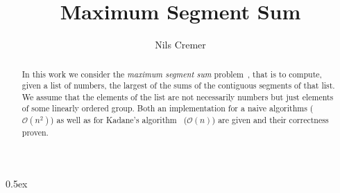\documentclass[11pt,a4paper]{article}
\begin{document}
\title{Maximum Segment Sum}
\author{Nils Cremer}
\maketitle

\begin{abstract}
  In this work we consider the \emph{maximum segment sum} problem~\cite{wiki}, that is to compute, given a list of numbers,
the largest of the sums of the contiguous segments of that list.
We assume that the elements of the list are not necessarily numbers but just elements
of some linearly ordered group.
Both an implementation for a naive algorithms ($\mathcal{O}(n^2)$) as well as for Kadane's algorithm~\cite{wiki} ($\mathcal{O}(n)$) are given and their correctness proven.
\end{abstract}

\tableofcontents

\parindent 0pt\parskip 0.5ex





\end{document}
